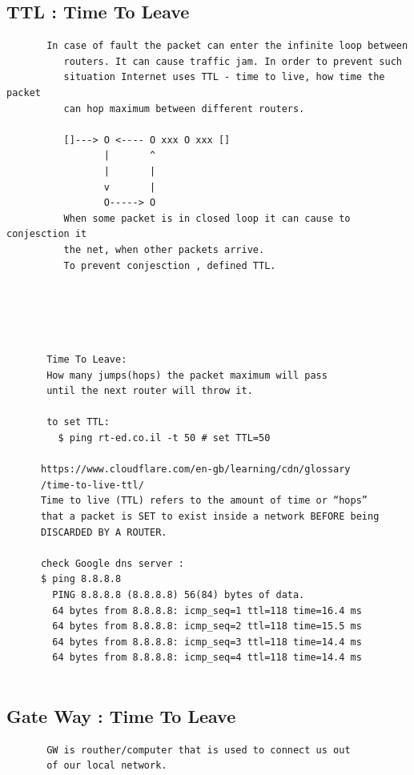 \documentclass[a4paper,12pt]{article}
\begin{document}
\subsection{TTL : Time To Leave}
\begin{verbatim}
       In case of fault the packet can enter the infinite loop between 
          routers. It can cause traffic jam. In order to prevent such 
          situation Internet uses TTL - time to live, how time the packet
          can hop maximum between different routers.
        
          []---> O <---- O xxx O xxx []      
                 |       ^
                 |       | 
                 v       |
                 O-----> O
          When some packet is in closed loop it can cause to conjesction it
          the net, when other packets arrive. 
          To prevent conjesction , defined TTL.
       
       
       
       
       
       Time To Leave:
       How many jumps(hops) the packet maximum will pass 
       until the next router will throw it.
       
       to set TTL:
         $ ping rt-ed.co.il -t 50 # set TTL=50       
      
      https://www.cloudflare.com/en-gb/learning/cdn/glossary
      /time-to-live-ttl/  
      Time to live (TTL) refers to the amount of time or “hops” 
      that a packet is SET to exist inside a network BEFORE being
      DISCARDED BY A ROUTER. 
      
      check Google dns server : 
      $ ping 8.8.8.8
        PING 8.8.8.8 (8.8.8.8) 56(84) bytes of data.
        64 bytes from 8.8.8.8: icmp_seq=1 ttl=118 time=16.4 ms
        64 bytes from 8.8.8.8: icmp_seq=2 ttl=118 time=15.5 ms
        64 bytes from 8.8.8.8: icmp_seq=3 ttl=118 time=14.4 ms
        64 bytes from 8.8.8.8: icmp_seq=4 ttl=118 time=14.4 ms 
       
\end{verbatim}

\subsection{Gate Way : Time To Leave}
\begin{verbatim}
       GW is routher/computer that is used to connect us out 
       of our local network.     
       
\end{verbatim}
\end{document}
